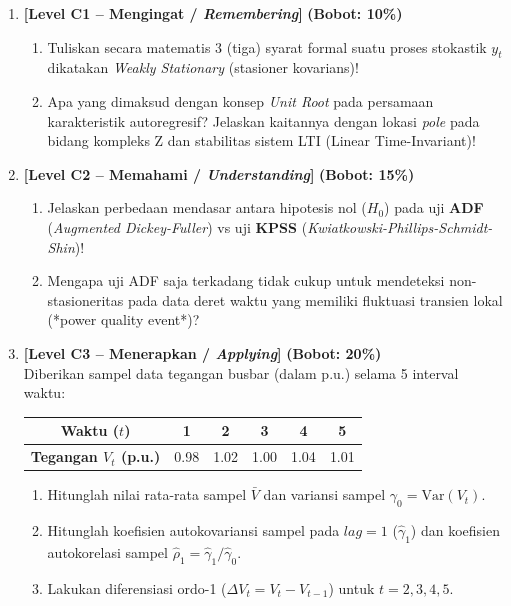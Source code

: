 \documentclass[11pt,a4paper]{article}
\begin{document}
\begin{enumerate}[leftmargin=1.5em, label=\textbf{Soal \arabic*.}]

    \item \textbf{[Level C1 -- Mengingat / \textit{Remembering}]} \hfill \textbf{(Bobot: 10\%)}
    \begin{enumerate}[label=\alph*.]
        \item Tuliskan secara matematis 3 (tiga) syarat formal suatu proses stokastik $y_t$ dikatakan \textit{Weakly Stationary} (stasioner kovarians)!
        \item Apa yang dimaksud dengan konsep \textit{Unit Root} pada persamaan karakteristik autoregresif? Jelaskan kaitannya dengan lokasi \textit{pole} pada bidang kompleks Z dan stabilitas sistem LTI (Linear Time-Invariant)!
    \end{enumerate}

    \vspace{0.3cm}

    \item \textbf{[Level C2 -- Memahami / \textit{Understanding}]} \hfill \textbf{(Bobot: 15\%)}
    \begin{enumerate}[label=\alph*.]
        \item Jelaskan perbedaan mendasar antara hipotesis nol ($H_0$) pada uji \textbf{ADF} (\textit{Augmented Dickey-Fuller}) vs uji \textbf{KPSS} (\textit{Kwiatkowski-Phillips-Schmidt-Shin})!
        \item Mengapa uji ADF saja terkadang tidak cukup untuk mendeteksi non-stasioneritas pada data deret waktu yang memiliki fluktuasi transien lokal (*power quality event*)?
    \end{enumerate}

    \vspace{0.3cm}

    \item \textbf{[Level C3 -- Menerapkan / \textit{Applying}]} \hfill \textbf{(Bobot: 20\%)} \\
    Diberikan sampel data tegangan busbar (dalam p.u.) selama 5 interval waktu:
    \begin{center}
    \begin{tabular}{|c|c|c|c|c|c|}
    \hline
    \rowcolor{boxbg}
    \textbf{Waktu ($t$)} & 1 & 2 & 3 & 4 & 5 \\ \hline
    \textbf{Tegangan $V_t$ (p.u.)} & 0.98 & 1.02 & 1.00 & 1.04 & 1.01 \\ \hline
    \end{tabular}
    \end{center}
    \begin{enumerate}[label=\alph*.]
        \item Hitunglah nilai rata-rata sampel $\bar{V}$ dan variansi sampel $\gamma_0 = \mathrm{Var}(V_t)$.
        \item Hitunglah koefisien autokovariansi sampel pada $lag = 1$ ($\hat{\gamma}_1$) dan koefisien autokorelasi sampel $\hat{\rho}_1 = \hat{\gamma}_1 / \hat{\gamma}_0$.
        \item Lakukan diferensiasi ordo-1 ($\Delta V_t = V_t - V_{t-1}$) untuk $t=2, 3, 4, 5$.
    \end{enumerate}


\end{enumerate}
\end{document}
